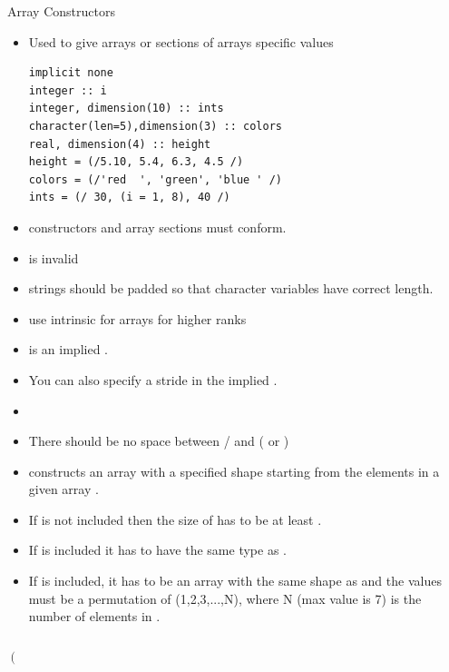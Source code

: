 \documentclass[10pt,t]{beamer}
\begin{document}
\begin{frame}{Array Constructors}
  \begin{itemize}
    \item Used to give arrays or sections of arrays specific values
      \begin{lstlisting}[language={[90]Fortran},basicstyle=\fontsize{6}{7}\selectfont\ttfamily]
implicit none
integer :: i
integer, dimension(10) :: ints
character(len=5),dimension(3) :: colors
real, dimension(4) :: height
height = (/5.10, 5.4, 6.3, 4.5 /)
colors = (/'red  ', 'green', 'blue ' /)
ints = (/ 30, (i = 1, 8), 40 /)
      \end{lstlisting}
    \item constructors and array sections must conform.
    \item[]  is invalid
    \item strings should be padded so that character variables have correct length.
    \item use  intrinsic for arrays for higher ranks
    \item {} is an implied .
    \item You can also specify a stride in the implied .
    \item[] 
    \item {\color{red}There should be no space between / and ( or )}
      \framebreak
    \item {} constructs an array with a specified shape  starting from the elements in a given array .
    \item If  is not included then the size of  has to be at least . 
    \item If  is included it has to have the same type as . 
    \item If  is included, it has to be an  array with the same shape as  and the values must be a permutation of (1,2,3,...,N), where N (max value is 7) is the number of elements in .
  \end{itemize}
  \begin{columns}[t]
    \column{2cm}
    {\tiny
      \[ \left( \begin{array}{ccc}

\end{array}\]}
\end{columns}
\end{frame}
\end{document}
